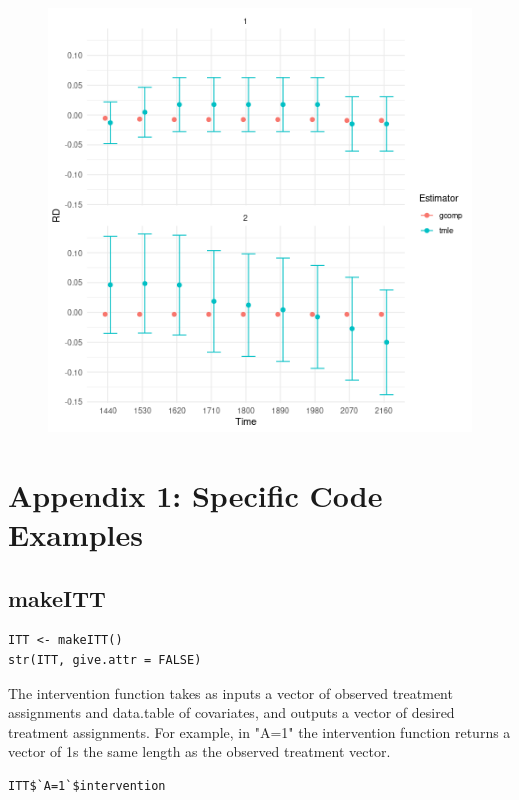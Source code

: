 \documentclass{report}
\newcommand{\1}{\ensuremath{\mathbf{1}}}
\begin{document}
\begin{figure}[H]
\includegraphics[width=0.9\linewidth]{concrete-pbc.png}
\end{figure}

\section{Appendix 1: Specific Code Examples}
\label{sec:org1945580}
\subsection{makeITT}
\label{sec:orgd0c5648}

\begin{lstlisting}
ITT <- makeITT()
str(ITT, give.attr = FALSE)
\end{lstlisting}

The intervention function takes as inputs a vector of observed treatment assignments and data.table of covariates, and outputs a vector of desired treatment assignments. For example, in "A=1" the intervention function returns a vector of 1s the same length as the observed treatment vector.

\begin{lstlisting}
ITT$`A=1`$intervention
\end{lstlisting}
\end{document}
